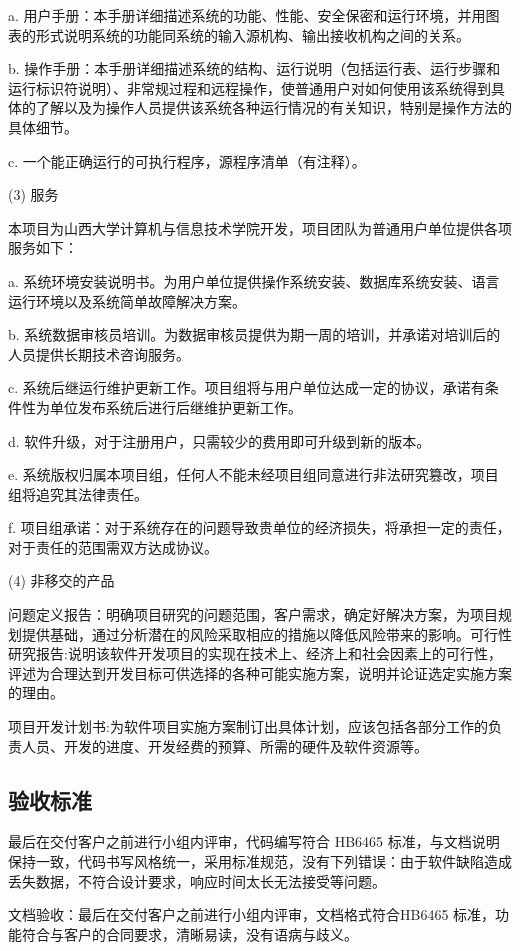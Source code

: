 \documentclass[
    report,     %
    oneside,    %
    UTF8,       %
    zihao=-4    %
]{config} %
\begin{document}
a. 用户手册：本手册详细描述系统的功能、性能、安全保密和运行环境，并用图表的形式说明系统的功能同系统的输入源机构、输出接收机构之间的关系。

b. 操作手册：本手册详细描述系统的结构、运行说明（包括运行表、运行步骤和运行标识符说明）、非常规过程和远程操作，使普通用户对如何使用该系统得到具体的了解以及为操作人员提供该系统各种运行情况的有关知识，特别是操作方法的具体细节。

c. 一个能正确运行的可执行程序，源程序清单（有注释）。

(3) 服务

本项目为山西大学计算机与信息技术学院开发，项目团队为普通用户单位提供各项服务如下：

a. 系统环境安装说明书。为用户单位提供操作系统安装、数据库系统安装、语言运行环境以及系统简单故障解决方案。

b. 系统数据审核员培训。为数据审核员提供为期一周的培训，并承诺对培训后的人员提供长期技术咨询服务。

c. 系统后继运行维护更新工作。项目组将与用户单位达成一定的协议，承诺有条件性为单位发布系统后进行后继维护更新工作。

d. 软件升级，对于注册用户，只需较少的费用即可升级到新的版本。

e. 系统版权归属本项目组，任何人不能未经项目组同意进行非法研究篡改，项目组将追究其法律责任。

f. 项目组承诺：对于系统存在的问题导致贵单位的经济损失，将承担一定的责任，对于责任的范围需双方达成协议。

(4) 非移交的产品

问题定义报告：明确项目研究的问题范围，客户需求，确定好解决方案，为项目规划提供基础，通过分析潜在的风险采取相应的措施以降低风险带来的影响。可行性研究报告:说明该软件开发项目的实现在技术上、经济上和社会因素上的可行性，评述为合理达到开发目标可供选择的各种可能实施方案，说明并论证选定实施方案的理由。

项目开发计划书:为软件项目实施方案制订出具体计划，应该包括各部分工作的负责人员、开发的进度、开发经费的预算、所需的硬件及软件资源等。

\subsection{验收标准}

最后在交付客户之前进行小组内评审，代码编写符合 HB6465 标准，与文档说明保持一致，代码书写风格统一，采用标准规范，没有下列错误：由于软件缺陷造成丢失数据，不符合设计要求，响应时间太长无法接受等问题。

文档验收：最后在交付客户之前进行小组内评审，文档格式符合HB6465 标准，功能符合与客户的合同要求，清晰易读，没有语病与歧义。
\end{document}
